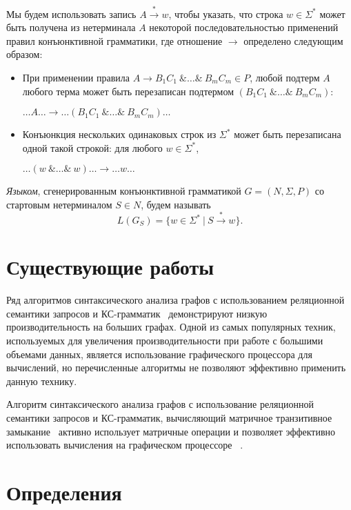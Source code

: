 \documentclass [a4paper] {article}
\begin{document}
	Мы будем использовать запись $A \xrightarrow{*} w$, чтобы указать, что строка $w \in \Sigma^*$ может быть получена из нетерминала $A$ некоторой последовательностью применений правил конъюнктивной грамматики, где отношение $\rightarrow$ определено следующим образом:
	\begin{itemize}
		\item При применении правила $A \rightarrow B_1 C_1~\& \ldots \&~B_m C_m \in P$, любой подтерм $A$ любого терма может быть перезаписан подтермом $(B_1 C_1 ~\& \ldots \&~ B_m C_m)$:
		\begin{center}
			$\ldots A \ldots \rightarrow \ldots (B_1 C_1~\& \ldots \&~B_m C_m) \ldots$
		\end{center}
		\item Конъюнкция нескольких одинаковых строк из $\Sigma^*$ может быть перезаписана одной такой строкой: для любого $w \in \Sigma^*$,
		\begin{center}
			$\ldots (w~\& \ldots \&~w) \ldots \rightarrow \ldots w \ldots$
		\end{center}
	
	\end{itemize}
	
	\textit{Языком}, сгенерированным конъюнктивной грамматикой $G = (N,\Sigma,P)$ со стартовым нетерминалом $S \in N$, будем называть $$L(G_S) = \{w \in \Sigma^*~|~S \xrightarrow{*} w\}.$$
	
	
	\section{Существующие работы}
	
	Ряд алгоритмов синтаксического анализа графов с использованием реляционной семантики запросов и КС-грамматик~\cite{hellingsRelational, RDF, GraphQueryWithEarley} демонстрируют низкую производительность на больших графах. Одной из самых популярных техник, используемых для увеличения производительности при работе с большими объемами данных, является использование графического процессора для вычислений, но перечисленные алгоритмы не позволяют эффективно применить данную технику.
	
	Алгоритм синтаксического анализа графов с использование реляционной семантики запросов и КС-грамматик, вычисляющий матричное транзитивное замыкание~\cite{azimov2018context} активно использует матричные операции и позволяет эффективно использовать вычисления на графическом процессоре ~\cite{matricesOnGPGPU}. 
	
	
	\section{Определения}
	
\end{document}
